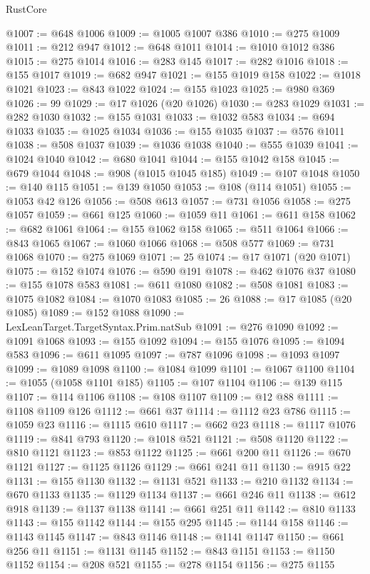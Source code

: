 \begin{lexlean}{RustCore}
\begin{coremodule}
@1007 := @648 @1006
@1009 := @1005 @1007 @386
@1010 := @275 @1009
@1011 := @212 @947
@1012 := @648 @1011
@1014 := @1010 @1012 @386
@1015 := @275 @1014
@1016 := @283 @145
@1017 := @282 @1016
@1018 := @155 @1017
@1019 := @682 @947
@1021 := @155 @1019 @158
@1022 := @1018 @1021
@1023 := @843 @1022
@1024 := @155 @1023
@1025 := @980 @369
@1026 := 99
@1029 := @17 @1026 (@20 @1026)
@1030 := @283 @1029
@1031 := @282 @1030
@1032 := @155 @1031
@1033 := @1032 @583
@1034 := @694 @1033
@1035 := @1025 @1034
@1036 := @155 @1035
@1037 := @576 @1011
@1038 := @508 @1037
@1039 := @1036 @1038
@1040 := @555 @1039
@1041 := @1024 @1040
@1042 := @680 @1041
@1044 := @155 @1042 @158
@1045 := @679 @1044
@1048 := @908 (@1015 @1045 @185)
@1049 := @107 @1048
@1050 := @140 @115
@1051 := @139 @1050
@1053 := @108 (@114 @1051)
@1055 := @1053 @42 @126
@1056 := @508 @613
@1057 := @731 @1056
@1058 := @275 @1057
@1059 := @661 @125
@1060 := @1059 @11
@1061 := @611 @158
@1062 := @682 @1061
@1064 := @155 @1062 @158
@1065 := @511 @1064
@1066 := @843 @1065
@1067 := @1060 @1066
@1068 := @508 @577
@1069 := @731 @1068
@1070 := @275 @1069
@1071 := 25
@1074 := @17 @1071 (@20 @1071)
@1075 := @152 @1074
@1076 := @590 @191
@1078 := @462 @1076 @37
@1080 := @155 @1078 @583
@1081 := @611 @1080
@1082 := @508 @1081
@1083 := @1075 @1082
@1084 := @1070 @1083
@1085 := 26
@1088 := @17 @1085 (@20 @1085)
@1089 := @152 @1088
@1090 := LexLeanTarget.TargetSyntax.Prim.natSub
@1091 := @276 @1090
@1092 := @1091 @1068
@1093 := @155 @1092
@1094 := @155 @1076
@1095 := @1094 @583
@1096 := @611 @1095
@1097 := @787 @1096
@1098 := @1093 @1097
@1099 := @1089 @1098
@1100 := @1084 @1099
@1101 := @1067 @1100
@1104 := @1055 (@1058 @1101 @185)
@1105 := @107 @1104
@1106 := @139 @115
@1107 := @114 @1106
@1108 := @108 @1107
@1109 := @12 @88
@1111 := @1108 @1109 @126
@1112 := @661 @37
@1114 := @1112 @23 @786
@1115 := @1059 @23
@1116 := @1115 @610
@1117 := @662 @23
@1118 := @1117 @1076
@1119 := @841 @793
@1120 := @1018 @521
@1121 := @508 @1120
@1122 := @810 @1121
@1123 := @853 @1122
@1125 := @661 @200 @11
@1126 := @670 @1121
@1127 := @1125 @1126
@1129 := @661 @241 @11
@1130 := @915 @22
@1131 := @155 @1130
@1132 := @1131 @521
@1133 := @210 @1132
@1134 := @670 @1133
@1135 := @1129 @1134
@1137 := @661 @246 @11
@1138 := @612 @918
@1139 := @1137 @1138
@1141 := @661 @251 @11
@1142 := @810 @1133
@1143 := @155 @1142
@1144 := @155 @295
@1145 := @1144 @158
@1146 := @1143 @1145
@1147 := @843 @1146
@1148 := @1141 @1147
@1150 := @661 @256 @11
@1151 := @1131 @1145
@1152 := @843 @1151
@1153 := @1150 @1152
@1154 := @208 @521
@1155 := @278 @1154
@1156 := @275 @1155

\end{coremodule}
\end{lexlean}
